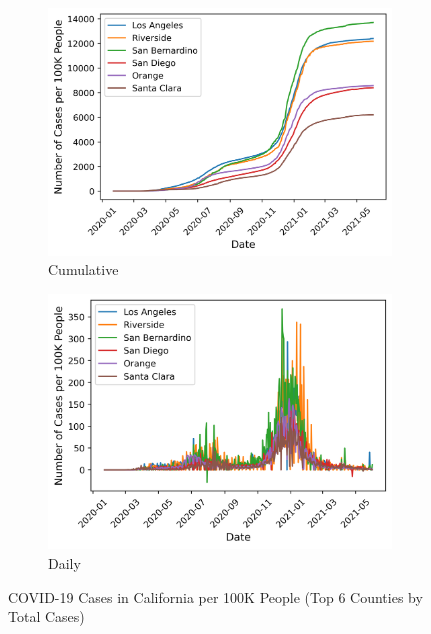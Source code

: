 \documentclass{article}
\begin{document}
\begin{figure}[hbt!]
    \centering
    \begin{subfigure}[b]{0.48\textwidth}
        \centering
        \includegraphics[width=\textwidth]{images/covid_cases_ca_county_cumulative_per_capita.png}
        \caption{Cumulative}
        \label{fig:traffic-eda-cumulative-per-capita}
    \end{subfigure}
    \hfill
    \begin{subfigure}[b]{0.48\textwidth}
        \centering
        \includegraphics[width=\textwidth]{images/covid_cases_ca_county_daily_per_capita.png}
        \caption{Daily}
        \label{fig:covid-eda-daily-per-capita}
    \end{subfigure}
    \caption{COVID-19 Cases in California per 100K People (Top 6 Counties by Total Cases)}
	\label{fig:covid-eda-per-capita}
\end{figure}
\end{document}
